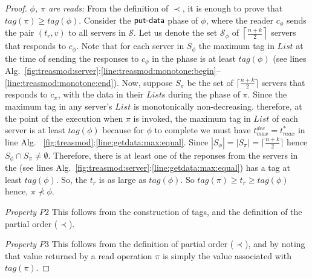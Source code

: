 \begin{proof}
\emph{ $\phi$, $\pi$ are reads:}
From  the definition of $\prec$, it is enough to prove that $tag(\pi) \geq tag(\phi)$. Consider the $\act{put-data}$ phase of $\phi$, where the reader $c_{\phi}$ sends the pair $(t_r, v)$ to all 
servers in $\mathcal{S}$. Let us denote the  set $\mathcal{S}_{\phi} $ of $\left\lceil \frac{n+k}{2} \right\rceil$ servers  that responds to $c_{\phi}$.  Note that for each server in $S_{\phi}$ the maximum tag in $List$ at the time of 
sending the responses to $c_{\phi}$ in the   phase is at least $tag(\phi)$ 
(see  lines  Alg.~\ref{fig:treasmod:server}:\ref{line:treasmod:monotone:begin}--\ref{line:treasmod:monotone:end}). 
Now, suppose $S_{\pi}$ be 
the set of $\lceil \frac{n+k}{2} \rceil$ servers that responds to $c_{\pi}$, with the data in their
 $List$s  during the  phase of $\pi$. 
Since the maximum tag in any server's $List$ is monotonically non-decreasing.%
therefore, at the point of the execution when $\pi$ is invoked, the maximum
tag in  $List$ of each server is at least $tag(\phi)$ because for $\phi$ to complete we must have 
$t_{max}^{dec} =  t_{max}^{*}$ in line Alg. ~\ref{fig:treasmod}:\ref{line:getdata:max:equal}.
%
Since $|S_{\phi}| = | S_{\pi}| = \lceil \frac{n+k}{2} \rceil$  hence 
$S_{\phi} \cap S_{\pi} \neq \emptyset $. Therefore, there is at least one of the  reponses from the servers in the 
(see lines Alg.~\ref{fig:treasmod:server}:\ref{line:getdata:max:equal}) has a tag at least $tag(\phi)$. So, the $t_r$ is as large as  $tag(\phi)$. So $tag(\pi) \geq t_r \geq tag(\phi)$ hence, $\pi \not\prec \phi$.



\emph{Property $P2$} This follows from the construction of tags, and the definition of the partial order ($\prec$).

\emph{Property $P3$} This follows from the definition of partial order ($\prec$), and by noting that value returned by a read operation $\pi$ is simply the value associated with $tag(\pi)$.
%
				\end{proof}
				
